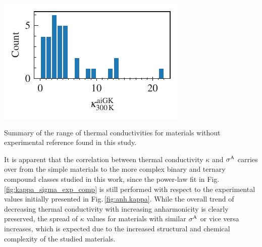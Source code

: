 \begin{marginfigure}
	\includegraphics[width=\textwidth]{./data/plots/kappa_histogram/histogram.pdf}
	\caption{Summary of the range of thermal conductivities for materials without experimental reference found in this study.}
	\label{fig:kappa_wo_exp_hist}
\end{marginfigure}
%
It is apparent that the correlation between thermal conductivity $\kappa$ and $\sigma^\mathrm{A}$ carries over from the simple materials to the more complex binary and ternary compound classes studied in this work, since the power-law fit in Fig.\,\ref{fig:kappa_sigma_exp_comp} is still performed with respect to the experimental values initially presented in Fig.\,\ref{fig:anh.kappa}. While the overall trend of decreasing thermal conductivity with increasing anharmonicity is clearly preserved, the spread of $\kappa$ values for materials with similar $\sigma^\mathrm{A}$ or vice versa increases, which is expected due to the increased structural and chemical complexity of the studied materials.


